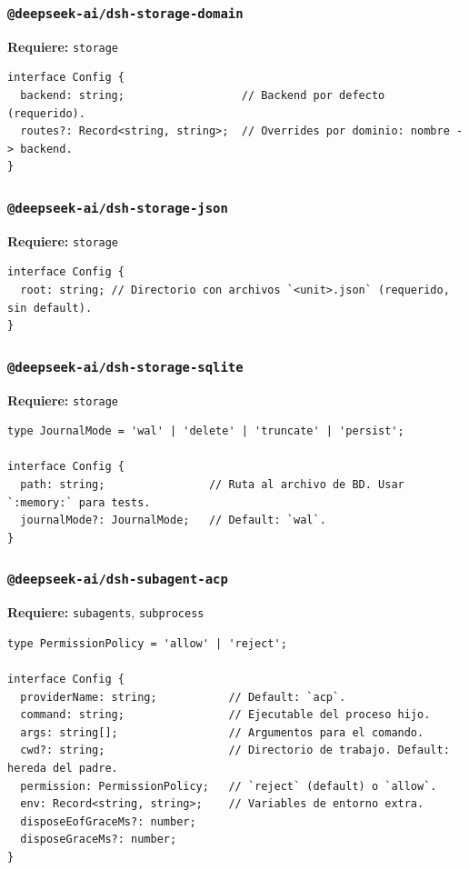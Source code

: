 \documentclass[11pt,a4paper]{article}
\begin{document}
\subsubsection*{\texttt{@deepseek-ai/dsh-storage-domain}}


\textbf{Requiere:} \texttt{storage}


\begin{lstlisting}
interface Config {
  backend: string;                  // Backend por defecto (requerido).
  routes?: Record<string, string>;  // Overrides por dominio: nombre -> backend.
}
\end{lstlisting}


\subsubsection*{\texttt{@deepseek-ai/dsh-storage-json}}


\textbf{Requiere:} \texttt{storage}


\begin{lstlisting}
interface Config {
  root: string; // Directorio con archivos `<unit>.json` (requerido, sin default).
}
\end{lstlisting}


\subsubsection*{\texttt{@deepseek-ai/dsh-storage-sqlite}}


\textbf{Requiere:} \texttt{storage}


\begin{lstlisting}
type JournalMode = 'wal' | 'delete' | 'truncate' | 'persist';

interface Config {
  path: string;                // Ruta al archivo de BD. Usar `:memory:` para tests.
  journalMode?: JournalMode;   // Default: `wal`.
}
\end{lstlisting}


\subsubsection*{\texttt{@deepseek-ai/dsh-subagent-acp}}


\textbf{Requiere:} \texttt{subagents}, \texttt{subprocess}


\begin{lstlisting}
type PermissionPolicy = 'allow' | 'reject';

interface Config {
  providerName: string;           // Default: `acp`.
  command: string;                // Ejecutable del proceso hijo.
  args: string[];                 // Argumentos para el comando.
  cwd?: string;                   // Directorio de trabajo. Default: hereda del padre.
  permission: PermissionPolicy;   // `reject` (default) o `allow`.
  env: Record<string, string>;    // Variables de entorno extra.
  disposeEofGraceMs?: number;
  disposeGraceMs?: number;
}
\end{lstlisting}
\end{document}
